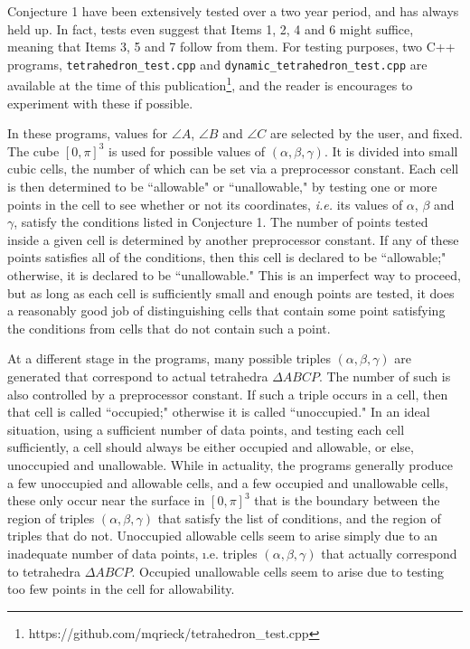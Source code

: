 \documentclass[a4paper, twoside]{article}
\begin{document}
Conjecture 1 have been extensively tested over a two year period, and has always held up. In fact, tests even suggest that Items 1, 2, 4 and 6 might suffice, meaning that Items 3, 5 and 7 follow from them.  For testing purposes, two C++ programs, {\tt tetrahedron\_test.cpp} and {\tt dynamic\_tetrahedron\_test.cpp} are available at the time of this publication\footnote{https://github.com/mqrieck/tetrahedron\_test.cpp}, and the reader is encourages to experiment with these if possible.  

In these programs, values for $\angle A$, $\angle B$ and $\angle C$ are selected by the user, and fixed. The cube $[0, \pi]^3$ is used for possible values of $(\alpha, \beta, \gamma)$. It is divided into small cubic cells, the number of which can be set via a preprocessor constant. Each cell is then determined to be ``allowable" or ``unallowable," by testing one or more points in the cell to see whether or not its coordinates, {\it i.e.} its values of $\alpha$, $\beta$ and $\gamma$, satisfy the conditions listed in Conjecture 1. The number of points tested inside a given cell is determined by another preprocessor constant. If any of these points satisfies all of the conditions, then this cell is declared to be ``allowable;" otherwise, it is declared to be ``unallowable." This is an imperfect way to proceed, but as long as each cell is sufficiently small and enough points are tested, it does a reasonably good job of distinguishing cells that contain some point satisfying the conditions from cells that do not contain such a point. 

At a different stage in the programs, many possible triples $(\alpha, \beta, \gamma)$ are generated that correspond to actual tetrahedra $\Delta ABCP$. The number of such is also controlled by a preprocessor constant. If such a triple occurs in a cell, then that cell is called ``occupied;" otherwise it is called ``unoccupied." In an ideal situation, using a sufficient number of data points, and testing each cell sufficiently, a cell should always be either occupied and allowable, or else, unoccupied and unallowable. While in actuality, the programs generally produce a few unoccupied and allowable cells, and a few occupied and unallowable cells, these only occur near the surface in $[0, \pi]^3$ that is the boundary between the region of triples $(\alpha, \beta, \gamma)$ that satisfy the list of conditions, and the region of triples that do not. Unoccupied allowable cells seem to arise simply due to an inadequate number of data points, {\i.e.} triples $(\alpha, \beta, \gamma)$ that actually correspond to tetrahedra $\Delta ABCP$. Occupied unallowable cells seem to arise due to testing too few points in the cell for allowability. 
\end{document}

